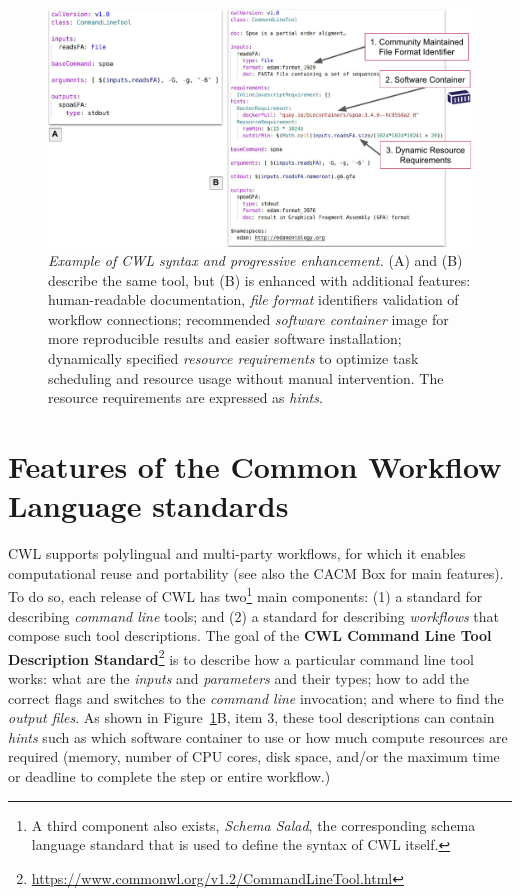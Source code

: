 \documentclass[sigconf,revew,screen,timestamp,nonacm]{acmart}
\begin{document}
\begin{figure}
  \centering
  \includegraphics[width=\textwidth]{figure3}
  \caption{\emph{Example of CWL syntax and progressive enhancement.} (A) and (B) describe the same tool, but (B) is enhanced with additional features: human-readable documentation, \textit{file format} identifiers validation of workflow connections; recommended \textit{software container} image for more reproducible results and easier software installation; dynamically specified \textit{resource requirements} to optimize task scheduling and resource usage without manual intervention. The resource requirements are expressed as \textit{hints}.}
  \label{fig:syntax}
 \end{figure}

\section{Features of the Common Workflow Language standards}\label{sec:features}\label{sec:design}

CWL supports polylingual and multi-party workflows, for which it enables computational reuse and portability (see also the CACM Box for main features). To do so, each release of CWL has two\footnote{A third component also exists, \textit{Schema Salad}, the corresponding schema language standard that is used to define the syntax of CWL itself.} main components: (1) a standard for describing \textit{command line} tools; and (2) a standard for describing \textit{workflows} that compose such tool descriptions. The goal of the \textbf{CWL Command Line Tool Description Standard}\footnote{\url{https://www.commonwl.org/v1.2/CommandLineTool.html}} is to describe how a particular command line tool works: what are the \textit{inputs} and \textit{parameters} and their types; how to add the correct flags and switches to the \textit{command line} invocation; and where to find the \textit{output files}. As shown in Figure~\ref{fig:syntax}B, item 3, these tool descriptions can contain \textit{hints} such as which software container to use or how much compute resources are required (memory, number of CPU cores, disk space, and/or the maximum time or deadline to complete the step or entire workflow.)
\end{document}

